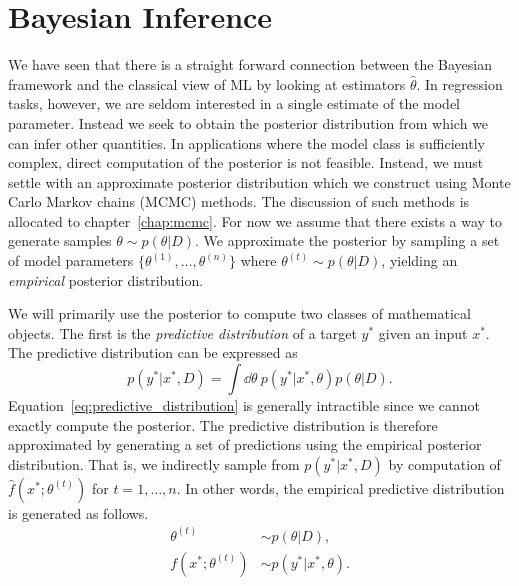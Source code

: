 \section{Bayesian Inference}
We have seen that there is a straight forward connection between the Bayesian framework
and the classical view of ML by looking at estimators $\hat{\theta}$. 
In regression tasks, however, we are seldom interested in a single estimate of the model parameter.
Instead we seek to obtain the posterior distribution from which we can infer other quantities.
In applications where the model class is sufficiently complex, direct computation
of the posterior is not feasible. Instead, we must settle with an approximate posterior distribution
which we construct using Monte Carlo Markov chains (MCMC) methods. 
The discussion of such methods is allocated to chapter~\ref{chap:mcmc}. For now we assume that there
exists a way to generate samples $\theta \sim p(\theta|D)$. We approximate the posterior
by sampling a set of model parameters $\{\theta^{(1)}, \ldots, \theta^{(n)}\}$ where $\theta^{(t)} \sim p(\theta|D)$, 
yielding an \textit{empirical} posterior distribution. 

We will primarily use the posterior to compute two classes of mathematical objects. 
The first is the \textit{predictive distribution} of a target $y^*$ given
an input $x^*$. The predictive distribution can be expressed as
\begin{equation}\label{eq:predictive_distribution}
    p(y^*|x^*, D) = \int \dd\theta \ p(y^*|x^*, \theta)p(\theta|D).
\end{equation}
Equation~\eqref{eq:predictive_distribution} is generally intractible since we cannot exactly compute the posterior.
The predictive distribution is therefore approximated by generating a set of predictions
using the empirical posterior distribution. That is, we indirectly sample from $p(y^*|x^*, D)$
by computation of $\hat{f}(x^*;\theta^{(t)})$ for $t=1,\ldots,n$. In other words, the empirical predictive distribution
is generated as follows.
\begin{equation}\label{eq:predictive_dist_approx}
    \begin{split}
        \theta^{(t)} & \sim p(\theta|D), \\
        f(x^*;\theta^{(t)}) & \sim p(y^*|x^*, \theta).
    \end{split}
\end{equation}

